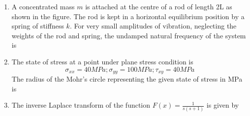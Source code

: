 \documentclass[journal,12pt,onecolumn]{IEEEtran}
\theoremstyle{remark}
\begin{document}
\begin{enumerate}
		\begin{figure}[H]
			\centering
			
			\caption{}
			\label{25}
		\end{figure}
		\begin{enumerate}
		\end{enumerate}
	\item A concentrated mass $m$ is attached at the centre of a rod of length 2L as shown in the figure. The rod is kept in a horizontal equilibrium position by a spring of stiffness $k$. For very small amplitudes of vibration, neglecting the weights of the rod and spring, the undamped natural frequency of the system is
		\begin{figure}[H]
			\centering
			
			\caption{}
			\label{25}
		\end{figure}
		\begin{enumerate}
				\begin{multicols}{4}
				\item $\sqrt{\frac{k}{m}}$
				\item $\sqrt{\frac{2k}{m}}$
				\item $\sqrt{\frac{k}{2m}}$
				\item $\sqrt{\frac{4k}{m}}$
				\end{multicols}
		\end{enumerate}
	\item The state of stress at a point under plane stress condition is 
		$$ \sigma_{xx} = 40 MPa ; \sigma_{yy} = 100 MPa ; \tau_{xy} = 40 MPa $$
		The radius of the Mohr's circle representing the given state of stress in MPa is 
		\begin{enumerate}
				\begin{multicols}{4}
				\item 40
				\item 50
				\item 60
				\item 100
				\end{multicols}
		\end{enumerate}
	\item The inverse Laplace transform of the function $F(x) = \frac{1}{s(s+1)}$ is given by
		\begin{enumerate}

\end{enumerate}
\end{enumerate}
\end{document}

